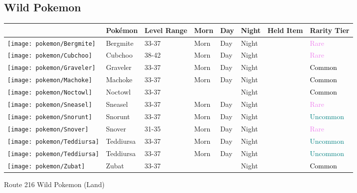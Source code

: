 \subsection{Wild Pokemon}%
\label{subsec:WildPokemon}%
\begin{longtable}{||l l l l l l l l||}%
\hline%
&Pokémon&Level Range&Morn&Day&Night&Held Item&Rarity Tier\\%
\hline%
\endhead%
\hline%
\texttt{[image: pokemon/Bergmite]}&Bergmite&33{-}37&Morn&Day&Night&&\textcolor{violet}{%
Rare%
}\\%
\hline%
\texttt{[image: pokemon/Cubchoo]}&Cubchoo&38{-}42&Morn&Day&Night&&\textcolor{violet}{%
Rare%
}\\%
\hline%
\texttt{[image: pokemon/Graveler]}&Graveler&33{-}37&Morn&Day&Night&&\textcolor{black}{%
Common%
}\\%
\hline%
\texttt{[image: pokemon/Machoke]}&Machoke&33{-}37&Morn&Day&Night&&\textcolor{black}{%
Common%
}\\%
\hline%
\texttt{[image: pokemon/Noctowl]}&Noctowl&33{-}37&&&Night&&\textcolor{black}{%
Common%
}\\%
\hline%
\texttt{[image: pokemon/Sneasel]}&Sneasel&33{-}37&Morn&Day&Night&&\textcolor{violet}{%
Rare%
}\\%
\hline%
\texttt{[image: pokemon/Snorunt]}&Snorunt&33{-}37&Morn&Day&Night&&\textcolor{teal}{%
Uncommon%
}\\%
\hline%
\texttt{[image: pokemon/Snover]}&Snover&31{-}35&Morn&Day&Night&&\textcolor{violet}{%
Rare%
}\\%
\hline%
\texttt{[image: pokemon/Teddiursa]}&Teddiursa&33{-}37&Morn&Day&Night&&\textcolor{teal}{%
Uncommon%
}\\%
\hline%
\texttt{[image: pokemon/Teddiursa]}&Teddiursa&33{-}37&Morn&Day&Night&&\textcolor{teal}{%
Uncommon%
}\\%
\hline%
\texttt{[image: pokemon/Zubat]}&Zubat&33{-}37&&&Night&&\textcolor{black}{%
Common%
}\\%
\hline%
\end{longtable}%
\caption{Route 216 Wild Pokemon (Land)}